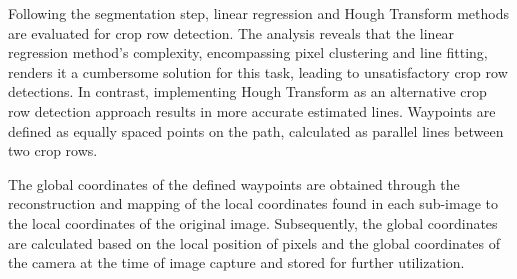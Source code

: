 \documentclass[conference]{IEEEtran}
\begin{document}
Following the segmentation step, linear regression and Hough Transform methods are evaluated for crop row detection. The analysis reveals that the linear regression method's complexity, encompassing pixel clustering and line fitting, renders it a cumbersome solution for this task, leading to unsatisfactory crop row detections. In contrast, implementing Hough Transform as an alternative crop row detection approach results in more accurate estimated lines. Waypoints are defined as equally spaced points on the path, calculated as parallel lines between two crop rows.

The global coordinates of the defined waypoints are obtained through the reconstruction and mapping of the local coordinates found in each sub-image to the local coordinates of the original image. Subsequently, the global coordinates are calculated based on the local position of pixels and the global coordinates of the camera at the time of image capture and stored for further utilization.
\end{document}
